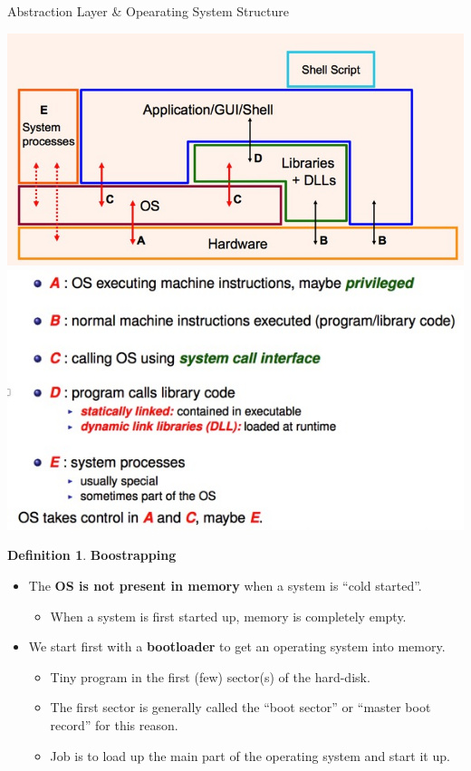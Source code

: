 \documentclass[12pt,a4paper]{article}
\theoremstyle{definition}
\newtheorem{definition}{Definition}[section]
\newenvironment{myitemize}
{ \begin{itemize}
    \setlength{\itemsep}{5pt}
    \setlength{\parskip}{0pt}
    \setlength{\parsep}{0pt}     }
{ \end{itemize}                  }
\begin{document}
\begin{tcolorbox}
	\textsf{Abstraction Layer \& Opearating System Structure}
	
	\includegraphics[scale=0.3]{m1/operatingSystemStructure}
		\centering
	\includegraphics[scale=0.4]{m1/abstractionLayerDescription}
		\centering
\end{tcolorbox}

\begin{definition}{\textbf{Boostrapping}}
	\begin{myitemize}
	\item The \textbf{OS is not present in memory} when a system is “cold started”.
	\begin{myitemize}
		\item When a system is first started up, memory is completely empty.
	\end{myitemize}
	\item We start first with a \textbf{bootloader} to get an operating system into memory.
	\begin{myitemize}
	\item Tiny program in the first (few) sector(s) of the hard-disk.
	\item The first sector is generally called the “boot sector” or “master boot record” for this reason.
	\item Job is to load up the main part of the operating system and start it up.
	\end{myitemize}
\end{myitemize}
\end{definition}
\end{document}
